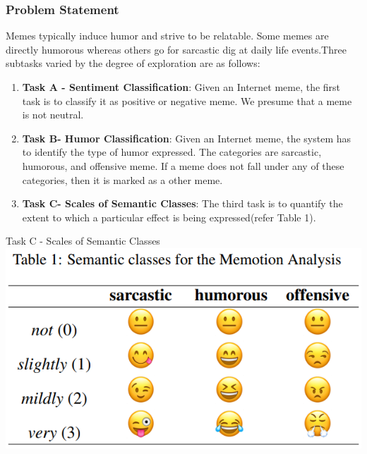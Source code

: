\documentclass[]{beamer}
\begin{document}
\begin{frame}\frametitle{Problem Statement}
  Memes typically induce humor and strive to be relatable. Some memes are directly humorous whereas others go for sarcastic dig at daily life events.Three subtasks varied by the degree of exploration are as follows:
   \begin{enumerate}
	\item  \textbf{Task A - Sentiment Classification}: Given an Internet meme, the first task is to classify it as positive or negative meme. We presume that a meme is not neutral.
	\item \textbf{Task B- Humor Classification}: Given an Internet meme, the system has to identify the type of humor expressed. The categories are sarcastic, humorous, and offensive meme. If a meme does not fall under any of these categories, then it is marked as a other meme. 
	\item \textbf{Task C- Scales of Semantic Classes}: The third task is to quantify the extent to which a particular effect is being expressed(refer Table 1).
\end{enumerate}
\end{frame}
\begin{frame}{Task C - Scales of Semantic Classes}
\includegraphics[scale=0.5]{exampleImg/semanticClass.png}
\end{frame}
\end{document}
